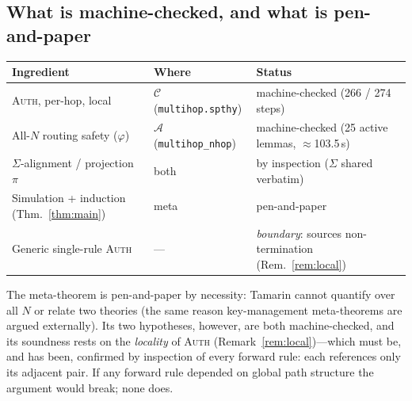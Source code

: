 \documentclass[11pt]{article}
\begin{document}
\subsection*{What is machine-checked, and what is pen-and-paper}

\begin{center}
\small
\begin{tabular}{@{}lll@{}}
\toprule
\textbf{Ingredient} & \textbf{Where} & \textbf{Status} \\
\midrule
\textsc{Auth}, per-hop, local & $\mathcal{C}$ (\texttt{multihop.spthy}) & machine-checked (266 / 274 steps) \\
All-$N$ routing safety ($\varphi$) & $\mathcal{A}$ (\texttt{multihop\_nhop}) & machine-checked (25 active lemmas, $\approx$103.5\,s) \\
$\Sigma$-alignment / projection $\pi$ & both & by inspection ($\Sigma$ shared verbatim) \\
Simulation + induction (Thm.~\ref{thm:main}) & meta & pen-and-paper \\
Generic single-rule \textsc{Auth} & --- & \emph{boundary}: sources non-termination (Rem.~\ref{rem:local}) \\
\bottomrule
\end{tabular}
\end{center}

\noindent
The meta-theorem is pen-and-paper by necessity: Tamarin cannot quantify over all
$N$ or relate two theories (the same reason key-management meta-theorems are
argued externally). Its two hypotheses, however, are both machine-checked, and
its soundness rests on the \emph{locality} of \textsc{Auth}
(Remark~\ref{rem:local})---which must be, and has been, confirmed by inspection
of every forward rule: each references only its adjacent pair. If any forward
rule depended on global path structure the argument would break; none does.

\end{document}
